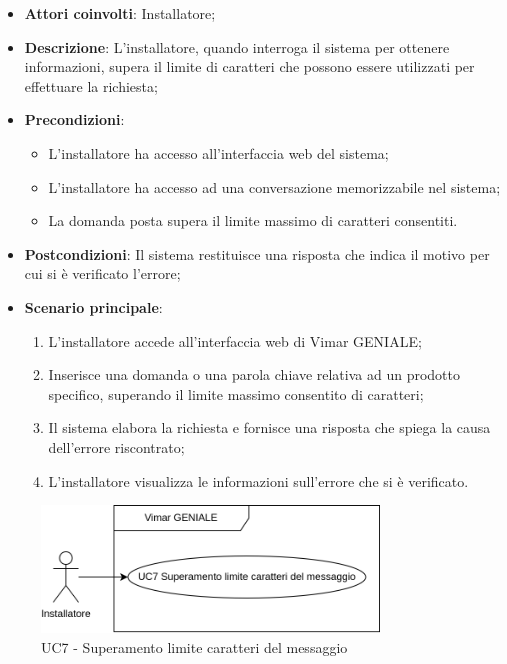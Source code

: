 \begin{itemize}
    \item \textbf{Attori coinvolti}: Installatore;
    \item \textbf{Descrizione}: L’installatore, quando interroga il sistema per ottenere informazioni, supera il limite di caratteri che possono essere utilizzati per effettuare la richiesta;
    \item \textbf{Precondizioni}: 
        \begin{itemize}
            \item L’installatore ha accesso all’interfaccia web del sistema;
            \item L’installatore ha accesso ad una conversazione memorizzabile nel sistema;
            \item La domanda posta supera il limite massimo di caratteri consentiti.
        \end{itemize}
    \item \textbf{Postcondizioni}: Il sistema restituisce una risposta che indica il motivo per cui si è verificato l’errore;
    \item \textbf{Scenario principale}:
    \begin{enumerate}
    \item L’installatore accede all’interfaccia web di Vimar GENIALE;
    \item Inserisce una domanda o una parola chiave relativa ad un prodotto specifico, superando il limite massimo consentito di caratteri;
    \item Il sistema elabora la richiesta e fornisce una risposta che spiega la causa dell'errore riscontrato;
    \item L’installatore visualizza le informazioni sull’errore che si è verificato.
    \end{enumerate}
\end{itemize}
\begin{figure}[H]
\centering
\includegraphics[width=0.8\textwidth]{contents/casi_duso/png/UC7.png}
\caption{UC7 - Superamento limite caratteri del messaggio}
\end{figure}


